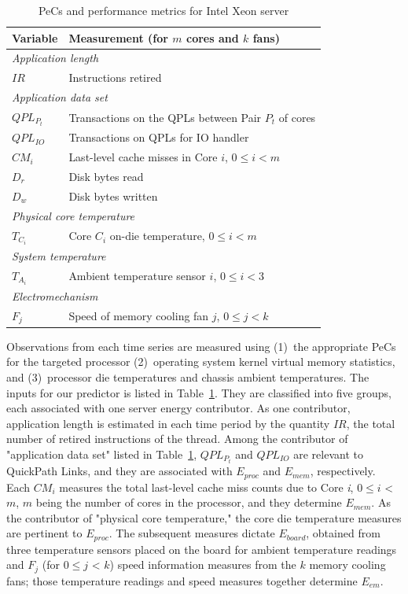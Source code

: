 \documentclass[times, 10pt,twocolumn]{IEEEtran}
\begin{document}
\begin{table}[tbhp]
  \centering
  \caption{PeCs and performance metrics for Intel Xeon server}
  \label{tab:intelmodel}
  \begin{tabular}{l l}
\hline
\hline
\textbf{Variable}&\textbf{Measurement} (for $m$ cores and $k$ fans)\\
\hline
\hline
\multicolumn{2}{l}{\textit{Application length}}\\
$IR$&Instructions retired \\
\hline
\multicolumn{2}{l}{\textit{Application data set}}\\
$QPL_{P_{t}}$&Transactions on the QPLs between Pair $P_{t}$ of cores\\
$QPL_{IO}$&Transactions on QPLs for IO handler\\
$CM_{i}$&Last-level cache misses in Core $i$, $0\leq i < m$\\
$D_{r}$&Disk bytes read\\
$D_{w}$&Disk bytes written\\
\hline
\multicolumn{2}{l}{\textit{Physical core temperature}}\\
$T_{C_{i}}$&Core $C_{i}$ on-die temperature, $0\leq i < m$\\
\hline
\multicolumn{2}{l}{\textit{System temperature}}\\
$T_{A_{i}}$&Ambient temperature sensor $i$, $0\leq i < 3$\\
\hline
\multicolumn{2}{l}{\textit{Electromechanism}}\\
$F_{j}$&Speed of memory cooling fan $j$, $0 \leq j < k$\\
\hline
  \end{tabular}
\end{table}

Observations from each time series are measured using (1)~the
appropriate PeCs for the targeted processor (2)~operating system kernel
virtual memory statistics, and (3)~processor die temperatures and
chassis ambient temperatures.  The inputs for our predictor is listed in
Table~\ref{tab:intelmodel}.  They are classified into five groups, each
associated with one server energy contributor.  As one contributor,
application length is estimated in each time period by the quantity
$IR$, the total number of retired instructions of the thread.  Among the
contributor of "application data set" listed in
Table~\ref{tab:intelmodel}, $QPL_{P_{t}}$ and $QPL_{IO}$ are relevant to
QuickPath Links, and they are associated with $E_{proc}$ and $E_{mem}$,
respectively.  Each $CM_{i}$ measures the total last-level cache miss
counts due to Core \textit{i}, $0 \leq i$ < $m$, $m$ being the number
of cores in the processor, and they determine $E_{mem}$.  As the
contributor of "physical core temperature," the core die temperature
measures are pertinent to $E_{proc}$.  The subsequent measures dictate
$E_{board}$, obtained from three temperature sensors placed on the board for
ambient temperature readings and $F_{j}$ (for $0\leq j$ < $k$) speed information measures from the $k$ memory cooling fans; those temperature readings and speed measures together determine $E_{em}$.
\end{document}
